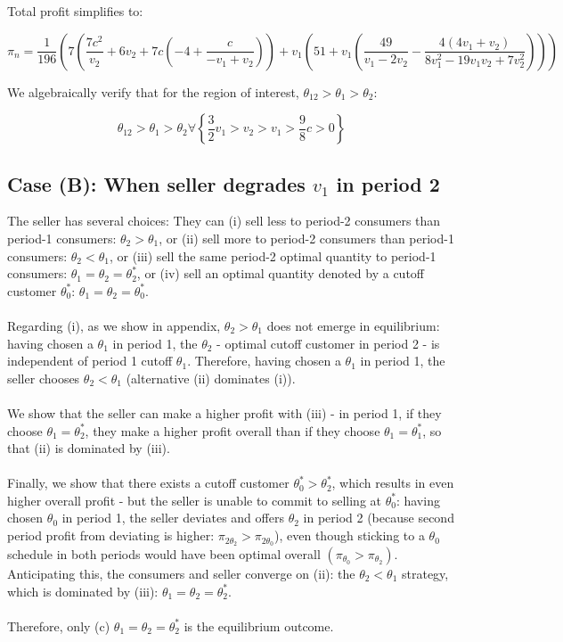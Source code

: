 \documentclass{article}
\begin{document}
Total profit simplifies to:

\begin{equation}
\pi _n=\frac{1}{196} \left(7 \left(\frac{7 c^2}{v_2}+6 v_2+7 c \left(-4+\frac{c}{-v_1+v_2}\right)\right)+v_1 \left(51+v_1 \left(\frac{49}{v_1-2 v_2}-\frac{4
\left(4 v_1+v_2\right)}{8 v_1^2-19 v_1 v_2+7 v_2^2}\right)\right)\right)
\end{equation}

We algebraically verify that for the region of interest, \(\theta _{12}>\theta _1>\theta _2\):

\begin{equation}
\theta _{12}>\theta _1>\theta _2\forall \left\{\frac{3}{2} v_1>v_2>v_1>\frac{9}{8}c>0\right\}
\end{equation}

\subsection*{Case (B): When seller degrades \(v_1\) in period 2}

The seller has several choices: They can (i) sell less to period-2 consumers than period-1 consumers: \(\theta _2>\theta _1\), or (ii) sell more
to period-2 consumers than period-1 consumers: \(\theta _2<\theta _1\), or (iii) sell the same period-2 optimal quantity to period-1 consumers: \(\theta
_1=\theta _2=\theta _2^*\), or (iv) sell an optimal quantity denoted by a cutoff customer \(\theta _0^*\): \(\theta _1=\theta _2=\theta _0^*\).\\
\hspace*{0.5ex} \\
Regarding (i), as we show in appendix, \(\theta _2>\theta _1\) does not emerge in equilibrium: having chosen a \(\theta _1\) in period 1, the \(\theta
_2\) - optimal cutoff customer in period 2 - is independent of period 1 { }cutoff \(\theta _1\). Therefore, having chosen a \(\theta _1\) in period
1, the seller chooses \(\theta _2<\theta _1\) (alternative (ii) dominates (i)). \\
\\
We show that the seller can make a higher profit with (iii) - in period 1, if they choose \(\theta _1=\theta _2^*\), they make a higher profit overall
than if they choose \(\theta _1=\theta _1^*\), so that (ii) is dominated by (iii). \\
\\
Finally, we show that there exists a cutoff customer \(\theta _0^*>\theta _2^*\), which results in even higher overall profit - but the seller is
unable to commit to selling at \(\theta _0^*\): having chosen \(\theta _0\) in period 1, the seller deviates and offers \(\theta _2\) in period 2
(because second period profit from deviating is higher: \(\pi _{2\theta _2}>\pi _{2\theta _0}\)), even though sticking to a \(\theta _0\) schedule
in both periods would have been optimal overall \(\left(\pi _{\theta _0}>\pi _{\theta _2}\right)\). Anticipating this, the consumers and seller converge
on (ii): the \(\theta _2<\theta _1\) strategy, which is dominated by (iii): \(\theta _1=\theta _2=\theta _2^*\).\\
\\
Therefore, only (c) \(\theta _1=\theta _2=\theta _2^*\) is the equilibrium outcome.
\end{document}
